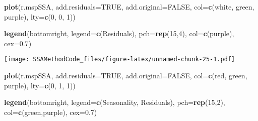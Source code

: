 \documentclass[
]{article}
\newenvironment{Shaded}{\begin{snugshade}}{\end{snugshade}}
\newcommand{\AttributeTok}[1]{\textcolor[rgb]{0.13,0.29,0.53}{#1}}
\newcommand{\ConstantTok}[1]{\textcolor[rgb]{0.56,0.35,0.01}{#1}}
\newcommand{\DecValTok}[1]{\textcolor[rgb]{0.00,0.00,0.81}{#1}}
\newcommand{\FloatTok}[1]{\textcolor[rgb]{0.00,0.00,0.81}{#1}}
\newcommand{\FunctionTok}[1]{\textcolor[rgb]{0.13,0.29,0.53}{\textbf{#1}}}
\newcommand{\NormalTok}[1]{#1}
\newcommand{\StringTok}[1]{\textcolor[rgb]{0.31,0.60,0.02}{#1}}
\begin{document}
\begin{Shaded}
\begin{Highlighting}[]
\FunctionTok{plot}\NormalTok{(r.mspSSA, }\AttributeTok{add.residuals=}\ConstantTok{TRUE}\NormalTok{, }\AttributeTok{add.original=}\ConstantTok{FALSE}\NormalTok{, }\AttributeTok{col=}\FunctionTok{c}\NormalTok{(}\StringTok{\textquotesingle{}white\textquotesingle{}}\NormalTok{, }\StringTok{\textquotesingle{}green\textquotesingle{}}\NormalTok{, }\StringTok{\textquotesingle{}purple\textquotesingle{}}\NormalTok{), }\AttributeTok{lty=}\FunctionTok{c}\NormalTok{(}\DecValTok{0}\NormalTok{, }\DecValTok{0}\NormalTok{, }\DecValTok{1}\NormalTok{))}

\FunctionTok{legend}\NormalTok{(}\StringTok{\textquotesingle{}bottomright\textquotesingle{}}\NormalTok{, }\AttributeTok{legend=}\FunctionTok{c}\NormalTok{(}\StringTok{\textquotesingle{}Residuals\textquotesingle{}}\NormalTok{), }\AttributeTok{pch=}\FunctionTok{rep}\NormalTok{(}\DecValTok{15}\NormalTok{,}\DecValTok{4}\NormalTok{), }\AttributeTok{col=}\FunctionTok{c}\NormalTok{(}\StringTok{\textquotesingle{}purple\textquotesingle{}}\NormalTok{), }\AttributeTok{cex=}\FloatTok{0.7}\NormalTok{)}
\end{Highlighting}
\end{Shaded}

\texttt{[image: SSAMethodCode\_files/figure-latex/unnamed-chunk-25-1.pdf]}

\begin{Shaded}
\begin{Highlighting}[]
\FunctionTok{plot}\NormalTok{(r.mspSSA, }\AttributeTok{add.residuals=}\ConstantTok{TRUE}\NormalTok{, }\AttributeTok{add.original=}\ConstantTok{FALSE}\NormalTok{, }\AttributeTok{col=}\FunctionTok{c}\NormalTok{(}\StringTok{\textquotesingle{}red\textquotesingle{}}\NormalTok{, }\StringTok{\textquotesingle{}green\textquotesingle{}}\NormalTok{, }\StringTok{\textquotesingle{}purple\textquotesingle{}}\NormalTok{), }\AttributeTok{lty=}\FunctionTok{c}\NormalTok{(}\DecValTok{0}\NormalTok{, }\DecValTok{1}\NormalTok{, }\DecValTok{1}\NormalTok{))}

\FunctionTok{legend}\NormalTok{(}\StringTok{\textquotesingle{}bottomright\textquotesingle{}}\NormalTok{, }\AttributeTok{legend=}\FunctionTok{c}\NormalTok{(}\StringTok{\textquotesingle{}Seasonality\textquotesingle{}}\NormalTok{, }\StringTok{\textquotesingle{}Residuals\textquotesingle{}}\NormalTok{), }\AttributeTok{pch=}\FunctionTok{rep}\NormalTok{(}\DecValTok{15}\NormalTok{,}\DecValTok{2}\NormalTok{), }\AttributeTok{col=}\FunctionTok{c}\NormalTok{(}\StringTok{\textquotesingle{}green\textquotesingle{}}\NormalTok{,}\StringTok{\textquotesingle{}purple\textquotesingle{}}\NormalTok{), }\AttributeTok{cex=}\FloatTok{0.7}\NormalTok{)}
\end{Highlighting}
\end{Shaded}
\end{document}
